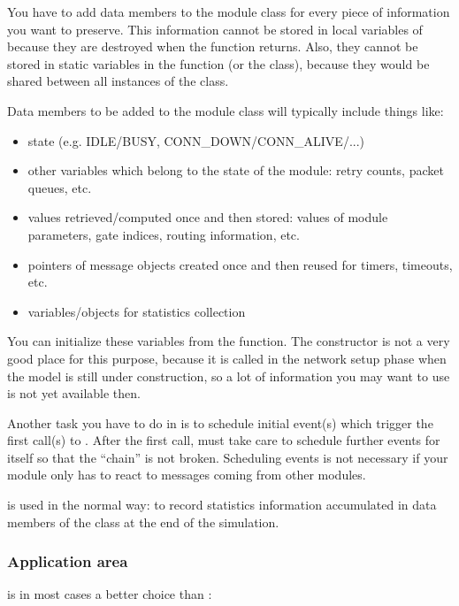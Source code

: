 You have to add data members to the module class for every piece
of information you want to preserve. This information cannot
be stored in local variables of  because they
are destroyed when the function returns. Also, they cannot be
stored in static variables in the function (or the class), because
they would be shared between all instances of the class.


Data members to be added to the module class will typically include
things like:

\begin{itemize}
  \item{state (e.g. IDLE/BUSY, CONN\_DOWN/CONN\_ALIVE/...)}
  \item{other variables which belong to the state of the module: retry
    counts, packet queues, etc.}
  \item{values retrieved/computed once and then stored: values of module
    parameters, gate indices, routing information, etc.}
  \item{pointers of message objects created once and then reused for
    timers, timeouts, etc.}
  \item{variables/objects for statistics collection}
\end{itemize}

You can initialize these variables from the 
function.  The constructor is not a very good place
for this purpose, because it is called in the network setup phase when
the model is still under construction, so a lot of information you may
want to use is not yet available then.

Another task you have to do in  is to schedule
initial event(s) which trigger the first call(s)
to .  After the first call,
 must take care to schedule further events for
itself so that the ``chain'' is not broken. Scheduling events is not
necessary if your module only has to react to messages coming from
other modules.

 is used in the normal way: to record statistics information
accumulated in data members of the class at the end of the simulation.


\subsubsection{Application area}


 is in most cases a better choice than :

